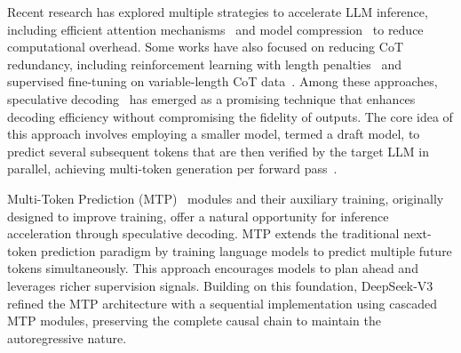 \documentclass{article} %
\begin{document}

Recent research has explored multiple strategies to accelerate LLM inference, including efficient attention mechanisms~\citep{katharopoulos2020transformers,child2019generating,yang2024gated,lu2025moba,dao2023flashattention2} and model compression~\citep{lin2024awq,xiao2024smoothquant,gu2024minillm,hsieh2023distilling} to reduce computational overhead. Some works have also focused on reducing CoT redundancy, including reinforcement learning with length penalties~\citep{luo2025o1pruner,aggarwal2025l1} and supervised fine-tuning on variable-length CoT data~\citep{ma2025cotvalve}. Among these approaches, speculative decoding~\citep{leviathan2023fast,chen2023accelerating,stern2018blockwise} has emerged as a promising technique that enhances decoding efficiency without compromising the fidelity of outputs. The core idea of this approach involves employing a smaller model, termed a draft model, to predict several subsequent tokens that are then verified by the target LLM in parallel, achieving multi-token generation per forward pass~\citep{zhou2024survey}.


Multi-Token Prediction (MTP)~\citep{gloeckle2024better} modules and their auxiliary training, originally designed to improve training, offer a natural opportunity for inference acceleration through speculative decoding. MTP extends the traditional next-token prediction paradigm by training language models to predict multiple future tokens simultaneously. This approach encourages models to plan ahead and leverages richer supervision signals. Building on this foundation, DeepSeek-V3~\citep{deepseek-ai2024deepseekv3} refined the MTP architecture with a sequential implementation using cascaded MTP modules, preserving the complete causal chain to maintain the autoregressive nature.
\end{document}
